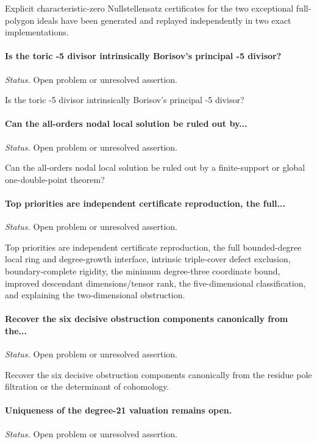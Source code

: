 Explicit characteristic-zero Nullstellensatz certificates for the two exceptional full-polygon ideals have been generated and replayed independently in two exact implementations.

\label{supp-note-06-042}
\paragraph{Is the toric -5 divisor intrinsically Borisov's principal -5 divisor?}
\emph{Status.} Open problem or unresolved assertion.

Is the toric -5 divisor intrinsically Borisov's principal -5 divisor?

\label{supp-note-06-043}
\paragraph{Can the all-orders nodal local solution be ruled out by...}
\emph{Status.} Open problem or unresolved assertion.

Can the all-orders nodal local solution be ruled out by a finite-support or global one-double-point theorem?

\label{supp-note-06-044}
\paragraph{Top priorities are independent certificate reproduction, the full...}
\emph{Status.} Open problem or unresolved assertion.

Top priorities are independent certificate reproduction, the full bounded-degree local ring and degree-growth interface, intrinsic triple-cover defect exclusion, boundary-complete rigidity, the minimum degree-three coordinate bound, improved descendant dimensions/tensor rank, the five-dimensional classification, and explaining the two-dimensional obstruction.

\label{supp-note-06-045}
\paragraph{Recover the six decisive obstruction components canonically from the...}
\emph{Status.} Open problem or unresolved assertion.

Recover the six decisive obstruction components canonically from the residue pole filtration or the determinant of cohomology.

\label{supp-note-06-046}
\paragraph{Uniqueness of the degree-21 valuation remains open.}
\emph{Status.} Open problem or unresolved assertion.

